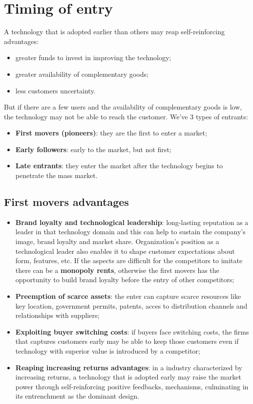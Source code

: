 \documentclass[12pt]{article}
\begin{document}
\section{Timing of entry}
A technology that is adopted earlier than others may reap self-reinforcing advantages:
\begin{itemize}
    \item greater funds to invest in improving the technology;
    \item greater availability of complementary goods;
    \item less customers uncertainty.
\end{itemize}
But if there are a few users and the availability of complementary goods is low, the technology may not be able to reach the customer.
We've 3 types of entrants:
\begin{itemize}
    \item \textbf{First movers (pioneers)}: they are the first to enter a market;
    \item \textbf{Early followers}: early to the market, but not first;
    \item \textbf{Late entrants}: they enter the market after the technology begins to penetrate the mass market.
\end{itemize}
\subsection{First movers advantages}
\begin{itemize}
    \item \textbf{Brand loyalty and technological leadership}: long-lasting reputation as a leader in that technology domain and this can help to sustain the company's image,
    brand loyalty and market share.
    Organization's position as a technological leader also enables it to shape customer expectations about form, features, etc.
    If the aspects are difficult for the competitors to imitate there can be a \textbf{monopoly rents}, otherwise the first movers has the opportunity to build brand loyalty before the entry of other competitors;
    \item \textbf{Preemption of scarce assets}: the enter can capture scarce resources like key location, government permits, patents, acces to distribution channels and relationships with suppliers;
    \item \textbf{Exploiting buyer switching costs}: if buyers face switching costs, the firms that captures customers early may be able to keep those customers even if technology with superior 
    value is introduced by a competitor;
    \item \textbf{Reaping increasing returns advantages}: in a industry characterized by increasing returns, a technology that is adopted early may raise the market power 
    through self-reinforcing positive feedbacks, mechanisms, culminating in its entrenchment as the dominant design.
\end{itemize}
\end{document}
